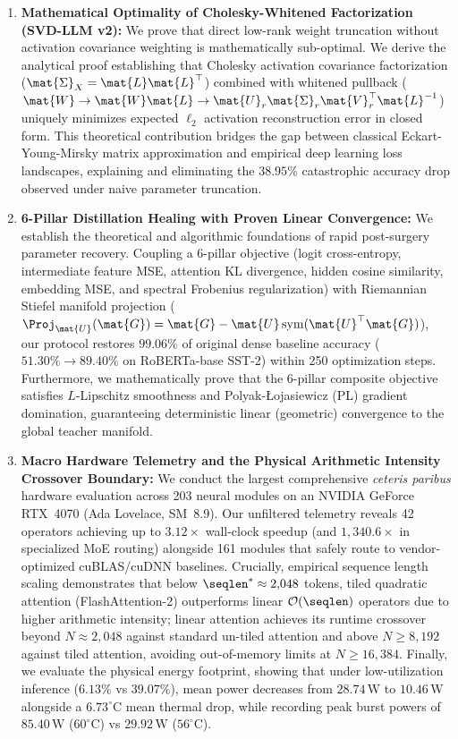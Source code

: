 \begin{enumerate}
    \item \textbf{Mathematical Optimality of Cholesky-Whitened Factorization (SVD-LLM v2):}
    We prove that direct low-rank weight truncation without activation covariance weighting is mathematically sub-optimal.
    We derive the analytical proof establishing that Cholesky activation covariance factorization ($\mat{\Sigma}_X = \mat{L}\mat{L}^\top$) combined with whitened pullback ($\mat{W} \to \mat{W}\mat{L} \to \mat{U}_r \mat{\Sigma}_r \mat{V}_r^\top \mat{L}^{-1}$) uniquely minimizes expected $\ell_2$ activation reconstruction error in closed form.
    This theoretical contribution bridges the gap between classical Eckart-Young-Mirsky matrix approximation and empirical deep learning loss landscapes, explaining and eliminating the $38.95\%$ catastrophic accuracy drop observed under naive parameter truncation.

    \item \textbf{6-Pillar Distillation Healing with Proven Linear Convergence:}
    We establish the theoretical and algorithmic foundations of rapid post-surgery parameter recovery.
    Coupling a 6-pillar objective (logit cross-entropy, intermediate feature MSE, attention KL divergence, hidden cosine similarity, embedding MSE, and spectral Frobenius regularization) with Riemannian Stiefel manifold projection ($\Proj_{\mat{U}}(\mat{G}) = \mat{G} - \mat{U}\operatorname{sym}(\mat{U}^\top \mat{G})$), our protocol restores \textbf{$99.06\%$} of original dense baseline accuracy ($51.30\% \to 89.40\%$ on RoBERTa-base SST-2) within 250 optimization steps.
    Furthermore, we mathematically prove that the 6-pillar composite objective satisfies $L$-Lipschitz smoothness and Polyak-\L{}ojasiewicz (PL) gradient domination, guaranteeing deterministic linear (geometric) convergence to the global teacher manifold.

    \item \textbf{Macro Hardware Telemetry and the Physical Arithmetic Intensity Crossover Boundary:}
    We conduct the largest comprehensive \emph{ceteris paribus} hardware evaluation across 203 neural modules on an NVIDIA GeForce RTX~4070 (Ada Lovelace, SM~8.9).
    Our unfiltered telemetry reveals 42 \passfast{} operators achieving up to $3.12\times$ wall-clock speedup (and $1{,}340.6\times$ in specialized MoE routing) alongside 161 \passslow{} modules that safely route to vendor-optimized cuBLAS/cuDNN baselines.
    Crucially, empirical sequence length scaling demonstrates that below $\seqlen^* \approx 2{,}048$ tokens, tiled quadratic attention (FlashAttention-2) outperforms linear $\mathcal{O}(\seqlen)$ operators due to higher arithmetic intensity; linear attention achieves its runtime crossover beyond $N \approx 2{,}048$ against standard un-tiled attention and above $N \ge 8{,}192$ against tiled attention, avoiding out-of-memory limits at $N \ge 16{,}384$.
    Finally, we evaluate the physical energy footprint, showing that under low-utilization inference ($6.13\%$ vs $39.07\%$), mean power decreases from $28.74\,\text{W}$ to $10.46\,\text{W}$ alongside a $6.73^\circ\text{C}$ mean thermal drop, while recording peak burst powers of $85.40\,\text{W}$ ($60^\circ\text{C}$) vs $29.92\,\text{W}$ ($56^\circ\text{C}$).
\end{enumerate}


